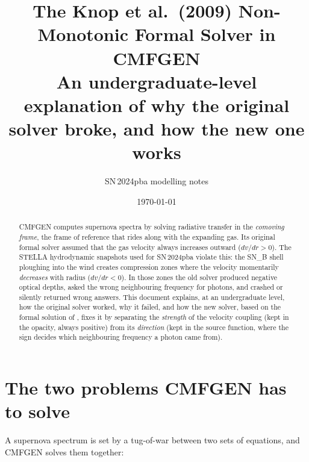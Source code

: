 \documentclass[11pt,a4paper]{article}
\title{The Knop et al.\ (2009) Non-Monotonic Formal Solver in CMFGEN\\[4pt]
       \large An undergraduate-level explanation of why the original
       solver broke, and how the new one works}
\author{SN\,2024pba modelling notes}
\date{\today}
\begin{document}
\maketitle

\begin{abstract}
\noindent CMFGEN computes supernova spectra by solving radiative
transfer in the \emph{comoving frame}, the frame of reference that
rides along with the expanding gas.  Its original formal solver assumed
that the gas velocity always increases outward ($dv/dr > 0$).  The
STELLA hydrodynamic snapshots used for SN\,2024pba violate this: the
SN\_B shell ploughing into the wind creates compression zones where the
velocity momentarily \emph{decreases} with radius ($dv/dr < 0$).  In
those zones the old solver produced negative optical depths, asked the
wrong neighbouring frequency for photons, and crashed or silently
returned wrong answers.  This document explains, at an undergraduate
level, how the original solver worked, why it failed, and how the new
solver, based on the formal solution of \citet{Knop2009}, fixes it by
separating the \emph{strength} of the velocity coupling (kept in the
opacity, always positive) from its \emph{direction} (kept in the source
function, where the sign decides which neighbouring frequency a photon
came from).
\end{abstract}

\tableofcontents
\bigskip

\section{The two problems CMFGEN has to solve}
\label{sec:two-problems}

A supernova spectrum is set by a tug-of-war between two sets of
equations, and CMFGEN \citep{Hillier1998} solves them together:
\end{document}
